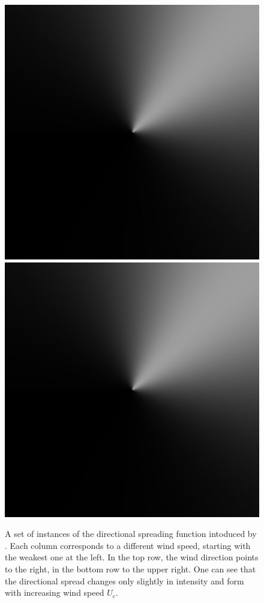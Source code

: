 \begin{figure}[p]
{ }
 \hfill
 \subtop
 {
 \includegraphics[scale=0.25]{figures/donelan_dfilt_wur_sqrt50.png}
 }
 \hfill
 \subtop
 {
 \includegraphics[scale=0.25]{figures/donelan_dfilt_wur_sqrt200.png}
 }
\caption{A set of instances of the directional spreading function intoduced by
\citet{article:Donelan1985}. Each column 
corresponds to a different wind speed, starting with the weakest one at the 
left. In the top row, the wind direction points to the right, in the bottom row 
to the upper right. 
One can see that the directional spread changes only slightly in intensity and
form with increasing wind speed $U_{c}$.}
\label{fig:donelan_directional_filter}
\end{figure}
